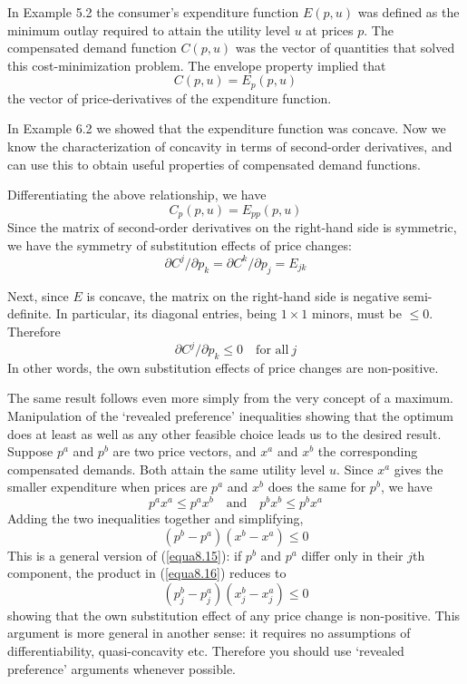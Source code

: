 In Example 5.2 the consumer's expenditure function $E(p,u)$ was defined as the minimum outlay required to attain the utility level $u$ at prices $p$. The compensated demand function $C(p,u)$ was the vector of quantities that solved this cost-minimization problem. The envelope property implied that 
\begin{equation*}
 C(p,u) = E_p (p,u)
\end{equation*}
the vector of price-derivatives of the expenditure function.

In Example 6.2 we showed that the expenditure function was concave. Now we know the characterization of concavity in terms of second-order derivatives, and can use this to obtain useful properties of compensated demand functions.

Differentiating the above relationship, we have
\begin{equation} \label{equa8.14}
  C_p(p,u) = E_{pp}(p,u)
\end{equation}
Since the matrix of second-order derivatives on the right-hand side is symmetric, we have the symmetry of substitution effects of price changes:
\begin{equation*}
 \partial C^j / \partial p_k = \partial C^k / \partial p_j = E_{jk}
\end{equation*}

Next, since $E$ is concave, the matrix on the right-hand side is negative semi-definite. In particular, its diagonal entries, being $1 \times 1$ minors, must be $\leq 0$. Therefore
\begin{equation} \label{equa8.15}
   \partial C^j / \partial p_k  \leq 0 \quad \mbox{for all} \ j
\end{equation}
In other words, the own substitution effects of price changes are non-positive.

The same result follows even more simply from the very concept of a maximum. Manipulation of the `revealed preference' inequalities showing that the optimum does at least as well as any other feasible choice leads us to the desired result. Suppose $p^a$ and $p^b$ are two price vectors, and $x^a$ and $x^b$ the corresponding compensated demands. Both attain the same utility level $u$. Since $x^a$ gives the smaller expenditure when prices are $p^a$ and $x^b$ does the same for $p^b$, we have
\begin{equation*}
  p^a x^a \leq p^a x^b  \quad \mbox{and} \quad p^b x^b \leq p^b x^a
\end{equation*}
Adding the two inequalities together and simplifying,
\begin{equation} \label{equa8.16}
  (p^b - p^a)(x^b - x^a ) \leq 0
\end{equation}
This is a general version of (\ref{equa8.15}): if $p^b$ and $p^a$ differ only in their $j$th component, the product in (\ref{equa8.16}) reduces to
\begin{equation*}
    (p_j^b - p_j^a)(x_j^b - x_j^a) \leq 0
\end{equation*}
showing that the own substitution effect of any price change is non-positive. This argument is more general in another sense: it requires no assumptions of differentiability, quasi-concavity etc. Therefore you should use `revealed preference' arguments whenever possible.

